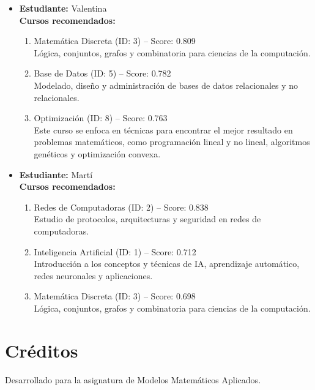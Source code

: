 \documentclass[12pt]{article}
\begin{document}
\begin{itemize}
    \item \textbf{Estudiante:} Valentina\\
    \textbf{Cursos recomendados:}
    \begin{enumerate}
        \item Matemática Discreta (ID: 3) -- Score: 0.809\\
        Lógica, conjuntos, grafos y combinatoria para ciencias de la computación.
        \item Base de Datos (ID: 5) -- Score: 0.782\\
        Modelado, diseño y administración de bases de datos relacionales y no relacionales.
        \item Optimización (ID: 8) -- Score: 0.763\\
        Este curso se enfoca en técnicas para encontrar el mejor resultado en problemas matemáticos, como programación lineal y no lineal, algoritmos genéticos y optimización convexa.
    \end{enumerate}

    \item \textbf{Estudiante:} Martí\\
    \textbf{Cursos recomendados:}
    \begin{enumerate}
        \item Redes de Computadoras (ID: 2) -- Score: 0.838\\
        Estudio de protocolos, arquitecturas y seguridad en redes de computadoras.
        \item Inteligencia Artificial (ID: 1) -- Score: 0.712\\
        Introducción a los conceptos y técnicas de IA, aprendizaje automático, redes neuronales y aplicaciones.
        \item Matemática Discreta (ID: 3) -- Score: 0.698\\
        Lógica, conjuntos, grafos y combinatoria para ciencias de la computación.
    \end{enumerate}
\end{itemize}

\section{Créditos}
Desarrollado para la asignatura de Modelos Matemáticos Aplicados.
\end{document}
